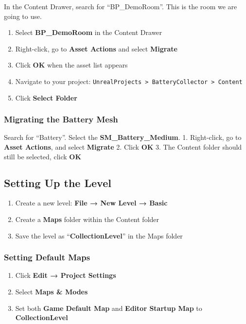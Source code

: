 \documentclass[
  letterpaper,
  DIV=11,
  numbers=noendperiod]{scrartcl}
\providecommand{\tightlist}{%
  \setlength{\itemsep}{0pt}\setlength{\parskip}{0pt}}
\begin{document}
In the Content Drawer, search for ``BP\_DemoRoom''. This is the room we
are going to use.

\begin{enumerate}
\def\labelenumi{\arabic{enumi}.}
\tightlist
\item
  Select \textbf{BP\_DemoRoom} in the Content Drawer
\item
  Right-click, go to \textbf{Asset Actions} and select \textbf{Migrate}
\item
  Click \textbf{OK} when the asset list appears
\item
  Navigate to your project:
  \texttt{UnrealProjects\ \textgreater{}\ BatteryCollector\ \textgreater{}\ Content}
\item
  Click \textbf{Select Folder}
\end{enumerate}

\subsubsection{Migrating the Battery
Mesh}\label{migrating-the-battery-mesh}

Search for ``Battery''. Select the \textbf{SM\_Battery\_Medium}. 1.
Right-click, go to \textbf{Asset Actions}, and select \textbf{Migrate}
2. Click \textbf{OK} 3. The Content folder should still be selected,
click \textbf{OK}

\subsection{Setting Up the Level}\label{setting-up-the-level}

\begin{enumerate}
\def\labelenumi{\arabic{enumi}.}
\tightlist
\item
  Create a new level: \textbf{File → New Level → Basic}
\item
  Create a \textbf{Maps} folder within the Content folder
\item
  Save the level as ``\textbf{CollectionLevel}'' in the Maps folder
\end{enumerate}

\subsubsection{Setting Default Maps}\label{setting-default-maps}

\begin{enumerate}
\def\labelenumi{\arabic{enumi}.}
\tightlist
\item
  Click \textbf{Edit → Project Settings}
\item
  Select \textbf{Maps \& Modes}
\item
  Set both \textbf{Game Default Map} and \textbf{Editor Startup Map} to
  \textbf{CollectionLevel}
\end{enumerate}
\end{document}
